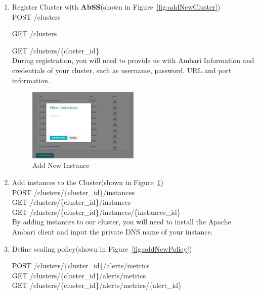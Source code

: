 \documentclass{article}
\begin{document}
\begin{enumerate}
  \item Register Cluster with \textbf{AbSS}(shown in Figure~\ref{fig:addNewCluster})\\
  
  POST /clusters 
  
  GET  /clusters  

  GET  /clusters/\{cluster\_id\} \\
  
  During registration, you will need to provide us with Ambari Information and credentials of your cluster, such as username, password, URL and port information.

\begin{figure}[ht!]
\centering
\includegraphics[width=0.5\textwidth,natwidth=1000,natheight=800]{addNewInstance.png}
\caption{Add New Instance}
\label{fig:addNewInstance}
\end{figure}
  \item Add instances to the Cluster(shown in Figure~\ref{fig:addNewInstance})\\
  POST  /clusters/\{cluster\_id\}/instances \\
  GET  /clusters/\{cluster\_id\}/instances \\
  GET  /clusters/\{cluster\_id\}/instances/\{instances\_id\}\\
  
  By adding instances to our cluster, you will need to install the Apache Ambari client and input the private DNS name of your instance.

 
  \item Define scaling policy(shown in Figure~\ref{fig:addNewPolicy})
  
  POST  /clusters/\{cluster\_id\}/alerts/metrics \\
  GET  /clusters/\{cluster\_id\}/alerts/metrics \\
   GET  /clusters/\{cluster\_id\}/alerts/metrics/\{alert\_id\} \\
   

\end{enumerate}
\end{document}
